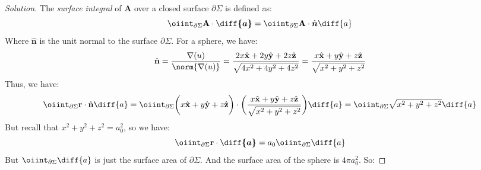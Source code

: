 \documentclass[crop=false,class=article,oneside]{standalone}
\begin{document}
        \begin{proof}[Solution]
            The \textit{surface integral} of $\mathbf{A}$
            over a closed surface
            $\partial\Sigma$ is defined as:
            \begin{equation*}
                \oiint_{\partial\Sigma}
                \mathbf{A}\cdot\boldsymbol{\diff{a}}
                =\oiint_{\partial\Sigma}\mathbf{A}
                \cdot\hat{\boldsymbol{n}}\diff{a}
            \end{equation*}
            Where $\hat{\mathbf{n}}$ is the unit normal
            to the surface $\partial\Sigma$.
            For a sphere, we have:
            \begin{equation*}
                \hat{\mathbf{n}}
                =\frac{\nabla(u)}{\norm{\nabla(u)}}
                =\frac{2x\hat{\mathbf{x}}
                +2y\hat{\mathbf{y}}
                +2z\hat{\mathbf{z}}}
                {\sqrt{4x^{2}+4y^{2}+4z^{2}}}
                =\frac{x\hat{\mathbf{x}}
                +y\hat{\mathbf{y}}
                +z\hat{\mathbf{z}}}
                {\sqrt{x^{2}+y^{2}+z^{2}}}
            \end{equation*}
            Thus, we have:
            \begin{equation*}
                \oiint_{\partial\Sigma}
                \mathbf{r}\cdot\hat{\mathbf{n}}\diff{a}
                =\oiint_{\partial\Sigma}
                \bigg(
                     x\hat{\mathbf{x}}
                    +y\hat{\mathbf{y}}
                    +z\hat{\mathbf{z}}
                \bigg)\cdot\bigg(
                    \frac{%
                         x\hat{\mathbf{x}}
                        +y\hat{\mathbf{y}}
                        +z\hat{\mathbf{z}}}
                        {\sqrt{x^{2}+y^{2}+z^{2}}}
                    \bigg)\diff{a}
                =\oiint_{\partial\Sigma}
                \sqrt{x^{2}+y^{2}+z^{2}}\diff{a}
            \end{equation*}
            But recall that $x^{2}+y^{2}+z^{2}=a_{0}^{2}$,
            so we have:
            \begin{equation*}
                \oiint_{\partial\Sigma}\mathbf{r}
                \cdot\boldsymbol{\diff{a}}
                =a_{0}\oiint_{\partial\Sigma}\diff{a}\\
            \end{equation*}
            But $\oiint_{\partial\Sigma}\diff{a}$
            is just the surface area of $\partial\Sigma$.
            And the surface area of the sphere
            is $4\pi{a_{0}^{2}}$. So:

\end{proof}
\end{document}
